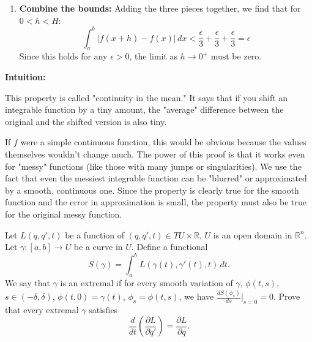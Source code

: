 \begin{solution}
\begin{enumerate}
    \item \textbf{Combine the bounds:} 
    Adding the three pieces together, we find that for $0 < h < H$:
    \[ \int_a^b |f(x+h) - f(x)| \, dx < \frac{\epsilon}{3} + \frac{\epsilon}{3} + \frac{\epsilon}{3} = \epsilon \]
    Since this holds for any $\epsilon > 0$, the limit as $h \to 0^+$ must be zero.
\end{enumerate}
\par\medskip
\textbf{Intuition:}
\par\medskip
This property is called "continuity in the mean." It says that if you shift an integrable function by a tiny amount, the "average" difference between the original and the shifted version is also tiny. 
\par\medskip
If $f$ were a simple continuous function, this would be obvious because the values themselves wouldn't change much. The power of this proof is that it works even for "messy" functions (like those with many jumps or singularities). We use the fact that even the messiest integrable function can be "blurred" or approximated by a smooth, continuous one. Since the property is clearly true for the smooth function and the error in approximation is small, the property must also be true for the original messy function.
\end{solution}

\begin{exercise}
\label{analysis:2015:9}
Let $L(q,q',t)$ be a function of $(q,q',t)\in TU\times\mathbb{R}$, $U$ is an open domain in $\mathbb{R}^n$. Let $\gamma:[a,b]\to U$ be a curve in $U$. Define a functional
\[
S(\gamma) = \int_a^b L(\gamma(t),\gamma'(t),t)\,dt.
\]
We say that $\gamma$ is an extremal if for every smooth variation of $\gamma$, $\phi(t,s)$, $s\in(-\delta,\delta)$, $\phi(t,0)=\gamma(t)$, $\phi_s=\phi(t,s)$, we have $\frac{dS(\phi_s)}{ds}|_{s=0}=0$. Prove that every extremal $\gamma$ satisfies
\[
\frac{d}{dt}\left(\frac{\partial L}{\partial q'}\right) = \frac{\partial L}{\partial q}.
\]
\end{exercise}


